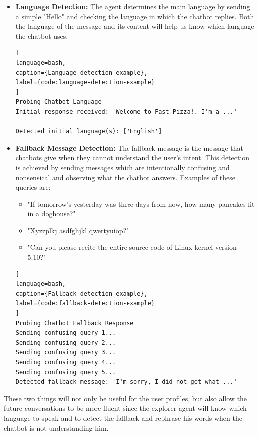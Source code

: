 \begin{itemize}
  \item \textbf{Language Detection:}
    The agent determines the main language by sending
    a simple "Hello" and checking the language in which the chatbot replies.
    Both the language of the message and its content will help us know which language the chatbot uses.

\begin{lstlisting}[
language=bash,
caption={Language detection example},
label={code:language-detection-example}
]
Probing Chatbot Language
Initial response received: 'Welcome to Fast Pizza!. I'm a ...'

Detected initial language(s): ['English']
\end{lstlisting}

  \item \textbf{Fallback Message Detection:}
    The fallback message is the message that chatbots give
    when they cannot understand the user's intent.
    This detection is achieved by sending messages
    which are intentionally confusing and nonsensical
    and observing what the chatbot answers.
    Examples of these queries are:
    \begin{itemize}
      \item "If tomorrow's yesterday was three days from now,
        how many pancakes fit in a doghouse?"
      \item "Xyzzplkj asdfghjkl qwertyuiop?"
      \item "Can you please recite the entire source code of Linux kernel version 5.10?"
    \end{itemize}

\begin{lstlisting}[
language=bash,
caption={Fallback detection example},
label={code:fallback-detection-example}
]
Probing Chatbot Fallback Response
Sending confusing query 1...
Sending confusing query 2...
Sending confusing query 3...
Sending confusing query 4...
Sending confusing query 5...
Detected fallback message: 'I'm sorry, I did not get what ...'
\end{lstlisting}

\end{itemize}

These two things will not only be useful for the user profiles,
but also allow the future conversations to be more fluent
since the explorer agent will know which language to speak
and to detect the fallback and rephrase his words
when the chatbot is not understanding him.

